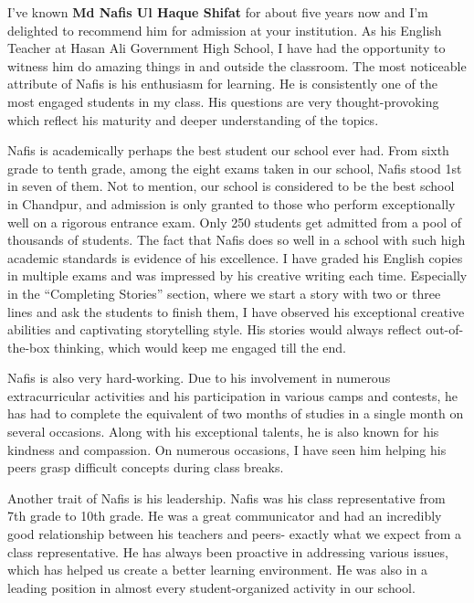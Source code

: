 \documentclass[12pt]{article}
\begin{document}
\sffamily

\setlength{\parskip}{1em} 
I’ve known \textbf{Md Nafis Ul Haque Shifat} for about five years now and I’m delighted to recommend him for admission at your institution. As his English Teacher at Hasan Ali Government High School, I have had the opportunity to witness him do amazing things in and outside the classroom. The most noticeable attribute of Nafis is his enthusiasm for learning. He is consistently one of the most engaged students in my class. His questions are very thought-provoking which reflect his maturity and deeper understanding of the topics.

Nafis is academically perhaps the best student our school ever had. From sixth grade to tenth grade, among the eight exams taken in our school, Nafis stood 1st in seven of them. Not to mention, our school is considered to be the best school in Chandpur, and admission is only granted to those who perform exceptionally well on a rigorous entrance exam. Only 250 students get admitted from a pool of thousands of students. The fact that Nafis does so well in a school with such high academic standards is evidence of his excellence. I have graded his English copies in multiple exams and was impressed by his creative writing each time. Especially in the “Completing Stories” section, where we start a story with two or three lines and ask the students to finish them, I have observed his exceptional creative abilities and captivating storytelling style. His stories would always reflect out-of-the-box thinking, which would keep me engaged till the end.

Nafis is also very hard-working. Due to his involvement in numerous extracurricular activities and his participation in various camps and contests, he has had to complete the equivalent of two months of studies in a single month on several occasions. Along with his exceptional talents, he is also known for his kindness and compassion. On numerous occasions, I have seen him helping his peers grasp difficult concepts during class breaks.

Another trait of Nafis is his leadership. Nafis was his class representative from 7th grade to 10th grade. He was a great communicator and had an incredibly good relationship between his teachers and peers- exactly what we expect from a class representative. He has always been proactive in addressing various issues, which has helped us create a better learning environment. He was also in a leading position in almost every student-organized activity in our school.
\end{document}
